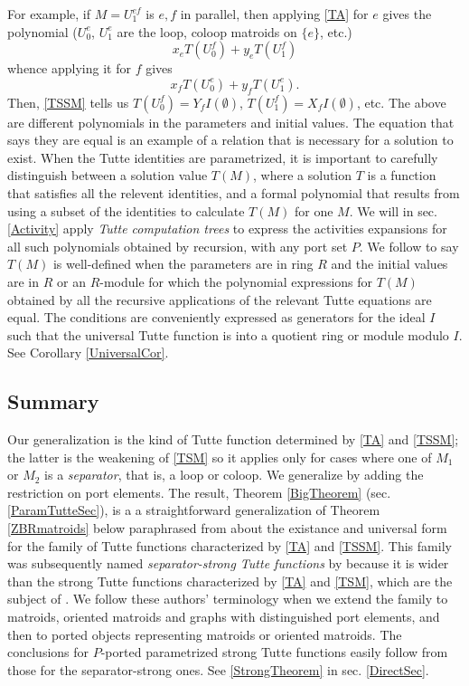 \documentclass[12pt,leqno]{amsart}
\theoremstyle{remark}
\begin{document}
For example, if $M=U_{1}^{ef}$ is  ${e,f}$ in parallel, then
applying \eqref{TA} for $e$ gives the polynomial
($U^e_0$, $U^e_1$ are the loop, coloop matroids on $\{e\}$, etc.)
\[x_e T(U_0^f) + y_e T(U_1^f)\]
 whence applying it for $f$ gives 
\[x_f T(U_0^e) + y_f T(U_1^e).\]  
Then, \eqref{TSSM} tells us $T(U_0^f)=Y_fI(\emptyset)$, 
$T(U_1^f)=X_fI(\emptyset)$, etc.
The above are different polynomials in the parameters and initial values.  
The equation that says they are equal is an example of a relation that 
is necessary for a solution to exist.  
When the Tutte identities are 
parametrized, it is important to carefully distinguish 
between a solution value $T(M)$, where a solution $T$ 
is a function  that
satisfies all the relevent identities, and a formal polynomial  that
results from using a subset of the identities to calculate
$T(M)$ for one $M$\cite{MR93a:05047}.  We will in 
sec. \ref{Activity} apply
\emph{Tutte computation trees} \cite{GordonMcMachonGreedoid} 
to express the activities expansions for all
such polynomials obtained by recursion, with any port set $P$.
We follow \cite{BollobasRiordanTuttePolyColored,Ellis-Monaghan-Traldi}
to say $T(M)$ is well-defined when the parameters are in 
ring $R$ and the initial values are in
$R$ or an $R$-module for which the polynomial expressions for $T(M)$ 
obtained by all the recursive applications of the relevant
Tutte equations are equal.
The conditions are conveniently expressed as generators 
for the ideal $I$ such that the universal Tutte function is into
a quotient ring or module modulo $I$.
See Corollary \ref{UniversalCor}.

\subsection{Summary}

Our generalization is the kind of Tutte function determined by 
\eqref{TA} and \eqref{TSSM}; the latter is the weakening of \eqref{TSM} 
so it applies only for cases where one of $M_1$ or $M_2$ is a 
\emph{separator}, that is, a loop or coloop.  
We generalize by adding the restriction on 
port elements.
The result, Theorem \ref{BigTheorem} (sec. \ref{ParamTutteSec}), is a 
a straightforward
generalization of Theorem \ref{ZBRmatroids}
below paraphrased from 
\cite{Ellis-Monaghan-Traldi}
about the existance and universal form for 
the family of Tutte functions characterized by \eqref{TA} and \eqref{TSSM}.
This family was subsequently
named \emph{separator-strong Tutte functions} by \cite{JoAndTom}
because it is wider than the strong Tutte functions characterized
by \eqref{TA} and \eqref{TSM}, which are the subject of 
\cite{MR93a:05047}.  We follow these authors' terminology when we extend the
family to matroids, oriented matroids and graphs with distinguished 
port elements, and then to ported objects 
representing  matroids or oriented matroids.
The conclusions for $P$-ported parametrized
strong Tutte functions easily follow from those for the separator-strong ones.
See \ref{StrongTheorem} in sec. \ref{DirectSec}.
\end{document}
